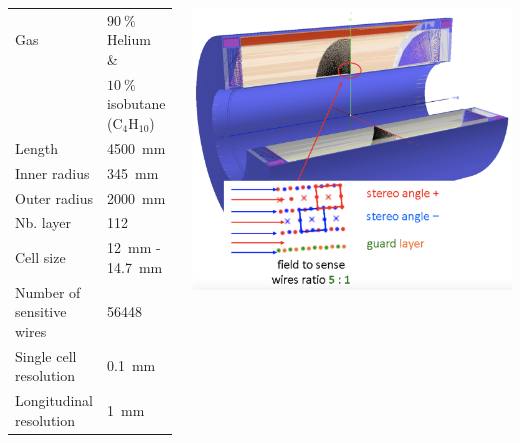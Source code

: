 \documentclass[final,xcolor={dvipsnames,svgnames,x11names,table}]{beamer}
\begin{document}
\begin{frame}
\begin{textblock}{82}
\begin{tcolorbox}[title=The drift chamber]
\begin{columns}
\begin{columns}
      \centering
      \begin{adjustbox}{max width=0.8\textwidth}
        \begin{tabular}{l l}
          \toprule
            Gas & $90~\%$ Helium \&\\
            & $10~\%$ isobutane ($\text{C}_{4}\text{H}_{10}$) \\
            Length & 4500~mm \\
            Inner radius & 345~mm \\
            Outer radius & 2000~mm\\
            Nb. layer & 112 \\
            Cell size & 12~mm - 14.7~mm \\
            Number of sensitive wires & 56448 \\
            Single cell resolution & 0.1~mm \\
            Longitudinal resolution & 1~mm \\
          \bottomrule
        \end{tabular}
      \end{adjustbox}

    \end{columns}

    \centering
    \includegraphics[width=\textwidth]{Figures/DriftChamber}



\end{columns}
\end{tcolorbox}
\end{textblock}
\end{frame}
\end{document}
